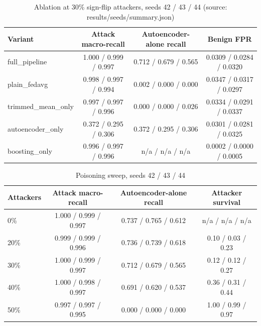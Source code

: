 \begin{table}[H]
\centering
\small
\setlength{\tabcolsep}{3pt}
\renewcommand{\arraystretch}{1.15}
\begin{tabular}{|l|c|c|c|}
\hline
\textbf{Variant} & \textbf{Attack macro-recall} & \textbf{Autoencoder-alone recall} & \textbf{Benign FPR} \\ \hline
full\_pipeline & 1.000 / 0.999 / 0.997 & 0.712 / 0.679 / 0.565 & 0.0309 / 0.0284 / 0.0320 \\ \hline
plain\_fedavg & 0.998 / 0.997 / 0.994 & 0.002 / 0.000 / 0.000 & 0.0347 / 0.0317 / 0.0297 \\ \hline
trimmed\_mean\_only & 0.997 / 0.997 / 0.996 & 0.000 / 0.000 / 0.026 & 0.0334 / 0.0291 / 0.0337 \\ \hline
autoencoder\_only & 0.372 / 0.295 / 0.306 & 0.372 / 0.295 / 0.306 & 0.0301 / 0.0281 / 0.0325 \\ \hline
boosting\_only & 0.996 / 0.997 / 0.996 & n/a / n/a / n/a & 0.0002 / 0.0000 / 0.0005 \\ \hline
\end{tabular}
\caption{Ablation at 30\% sign-flip attackers, seeds 42 / 43 / 44 (source: results/seeds/summary.json)}
\label{tab:fu_seed_ablation}
\end{table}

\begin{table}[H]
\centering
\small
\setlength{\tabcolsep}{3pt}
\renewcommand{\arraystretch}{1.15}
\begin{tabular}{|l|c|c|c|}
\hline
\textbf{Attackers} & \textbf{Attack macro-recall} & \textbf{Autoencoder-alone recall} & \textbf{Attacker survival} \\ \hline
0\% & 1.000 / 0.999 / 0.997 & 0.737 / 0.765 / 0.612 & n/a / n/a / n/a \\ \hline
20\% & 0.999 / 0.999 / 0.996 & 0.736 / 0.739 / 0.618 & 0.10 / 0.03 / 0.23 \\ \hline
30\% & 1.000 / 0.999 / 0.997 & 0.712 / 0.679 / 0.565 & 0.12 / 0.12 / 0.27 \\ \hline
40\% & 1.000 / 0.998 / 0.997 & 0.691 / 0.620 / 0.537 & 0.36 / 0.31 / 0.44 \\ \hline
50\% & 0.997 / 0.997 / 0.995 & 0.000 / 0.000 / 0.000 & 1.00 / 0.99 / 0.97 \\ \hline
\end{tabular}
\caption{Poisoning sweep, seeds 42 / 43 / 44}
\label{tab:fu_seed_sweep}
\end{table}


